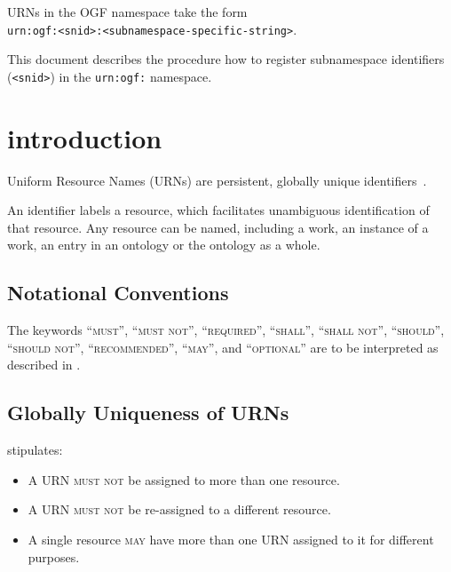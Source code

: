 \documentclass[12pt]{article}  %
\begin{document}
URNs in the OGF namespace take the form 
\\\hspace*{1cm}\texttt{urn:ogf:<snid>:<subnamespace-specific-string>}.

This document describes the procedure how to register subnamespace 
identifiers (\texttt{<snid>}) in the \texttt{urn:ogf:} namespace.

\tableofcontents

\newpage

\section{introduction}%
\label{sec:introduction}

Uniform Resource Names (URNs) are persistent, globally unique 
identifiers~\cite{rfc2141,rfc3406}.

An identifier labels a resource, which facilitates unambiguous identification 
of that resource. 
Any resource can be named, including a work, an instance of a work, an entry in 
an ontology or the ontology as a whole.

\subsection{Notational Conventions}
\label{sec:rfc2119}

\newcommand{\MUST}{\textsc{must}}
\newcommand{\MUSTNOT}{\textsc{must not}}
\newcommand{\REQUIRED}{\textsc{required}}
\newcommand{\SHALL}{\textsc{shall}}
\newcommand{\SHALLNOT}{\textsc{shall not}}
\newcommand{\SHOULD}{\textsc{should}}
\newcommand{\SHOULDNOT}{\textsc{should not}}
\newcommand{\RECOMMENDED}{\textsc{recommended}}
\newcommand{\MAY}{\textsc{may}}
\newcommand{\OPTIONAL}{\textsc{optional}}

The keywords “\MUST{}”, “\MUSTNOT{}”, “\REQUIRED{}”, “\SHALL{}”, “\SHALLNOT{}”, 
“\SHOULD{}”, “\SHOULDNOT{}”, “\RECOMMENDED{}”, “\MAY{}”,  and “\OPTIONAL{}” are 
to be interpreted as described in \cite{rfc2119}.

\subsection{Globally Uniqueness of URNs}%
\label{sec:uniqueness}

\cite{rfc3406} stipulates:
\begin{itemize}
  \item A URN \MUSTNOT{} be assigned to more than one resource. 
  \item A URN \MUSTNOT{} be re-assigned to a different resource.
  \item A single resource \MAY{} have more than one URN assigned to it for different purposes.
\end{itemize}
\end{document}
